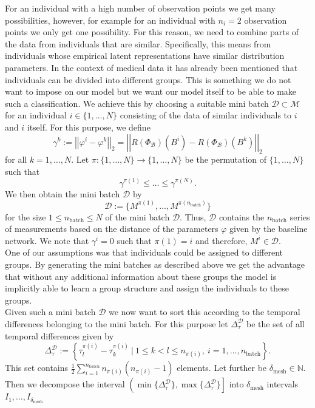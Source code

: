 \documentclass[11pt,titlepage]{article}
\newcommand{\N}{\mathbb{N}} %
\newcommand{\abs}[1]{{\left| #1 \right|}}
\theoremstyle{definition}
\theoremstyle{remark}
\begin{document}
	For an individual with a high number of observation points we get many possibilities, however, for example for an individual with $n_i=2$ observation points we only get one possibility. For this reason, we need to combine parts  of the data from individuals that are similar. Specifically, this means from individuals whose empirical latent representations have similar distribution parameters. In the context of medical data it has already been mentioned that individuals can be divided into different groups. This is something we do not want to impose on our model but we want our model itself to be able to make such a classification. We achieve this by choosing a suitable mini batch $\mathcal{D}\subset \mathcal{M}$ for an individual $i\in\{1,\ldots,N\}$ consisting of the data of similar individuals to $i$ and $i$ itself. For this purpose, we define 
	\[\gamma^k := \abs{\abs{\varphi^i - \varphi^k}}_2=\abs{\abs{R(\Phi_\mathcal{B})(B^i) - R(\Phi_\mathcal{B})(B^k)}}_2\]
	for all $k=1,\ldots, N$. Let $\pi :\{1,\ldots, N\}\to \{1,\ldots, N\}$ be the permutation 
	of $\{1,\ldots, N\}$ such that 
	\[\gamma^{\pi(1)}\leq\ldots\leq \gamma^{\pi(N)}.\]
	We then obtain the mini batch $\mathcal{D}$ by
	\[\mathcal{D}:= \{M^{\pi(1)},\ldots,M^{\pi(n_{\mathrm{batch}})}\}\]
	for the size $1\leq n_\mathrm{batch}\leq N$ of the mini batch $\mathcal{D}$. Thus, $\mathcal{D}$ contains the $n_\mathrm{batch}$ series of measurements based on the distance of the parameters $\varphi$ given by the baseline network. We note that $\gamma^i = 0$ such that $\pi(1)=i$ and therefore, $M^i\in\mathcal{D}$. \\
	One of our assumptions was that individuals could be assigned to different groups. By generating the mini batches as described above we get the advantage that without any additional information about these groups the model is implicitly able to learn a group structure and assign the individuals to these groups.\\
	Given such a mini batch $\mathcal{D}$ we now want to sort this according to the temporal differences belonging to the mini batch. For this purpose let $\Delta^\mathcal{D}_\tau$ be the 
	set of all temporal differences given by
	\[\Delta^\mathcal{D}_\tau := \left\{\tau^{\pi(i)}_l - \tau^{\pi(i)}_k \ \vert \ 1\leq k< l\leq n_{\pi(i)},\  i=1,\ldots,n_\mathrm{batch}\right\}.\]
	This set contains $\frac{1}{2}\sum_{i=1}^{n_\mathrm{batch}} n_{\pi(i)}(n_{\pi(i)}-1)$ elements. Let further be $\delta_\mathrm{mesh}\in\N$. Then we decompose the interval $\left(\min\{\Delta^\mathcal{D}_\tau\}, \max\{\Delta^\mathcal{D}_\tau\}\right]$ into $\delta_\mathrm{mesh}$ intervals $I_1,\ldots,I_{\delta_\mathrm{mesh}}$ 
\end{document}
